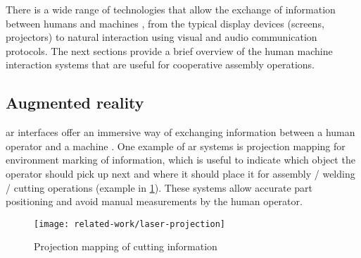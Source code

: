 There is a wide range of technologies that allow the exchange of information between humans and machines \cite{Goodrich2008}, from the typical display devices (screens, projectors) to natural interaction using visual and audio \cite{Yan2014} communication protocols. The next sections provide a brief overview of the human machine interaction systems that are useful for cooperative assembly operations.



\subsection{Augmented reality}

\gls{ar} interfaces offer an immersive way of exchanging information between a human operator and a machine \cite{Bimber2005,Michalos2016}. One example of \gls{ar} systems is projection mapping \cite{Tan2013,Fujimoto2014} for environment marking of information, which is useful to indicate which object the operator should pick up next and where it should place it for assembly / welding / cutting operations (example in \cref{fig:laser-projection}). These systems allow accurate part positioning and avoid manual measurements by the human operator. 

\begin{figure}[H]
	\centering
	\texttt{[image: related-work/laser-projection]}
	\caption[Projection mapping of cutting information]{Projection mapping of cutting information\protect\footnotemark}
	\label{fig:laser-projection}
\end{figure}

%


